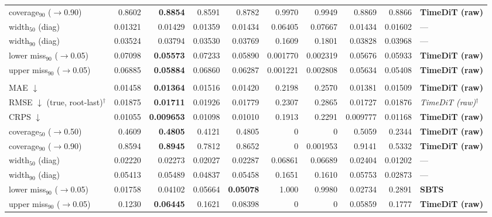 \documentclass[11pt,a4paper]{article}
\begin{document}
\begin{landscape}
\begin{center}
\begin{tabular}{lrrrrrrrrl}
coverage$_{90}$ ($\to$0.90) & 0.8602 & \textbf{0.8854} & 0.8591 & 0.8782 & 0.9970 & 0.9949 & 0.8869 & 0.8866 & \textbf{TimeDiT (raw)} \\
width$_{50}$ (diag) & 0.01321 & 0.01429 & 0.01359 & 0.01434 & 0.06405 & 0.07667 & 0.01434 & 0.01602 & --- \\
width$_{90}$ (diag) & 0.03524 & 0.03794 & 0.03530 & 0.03769 & 0.1609 & 0.1801 & 0.03828 & 0.03968 & --- \\
lower miss$_{90}$ ($\to$0.05) & 0.07098 & \textbf{0.05573} & 0.07233 & 0.05890 & 0.001770 & 0.002319 & 0.05676 & 0.05933 & \textbf{TimeDiT (raw)} \\
upper miss$_{90}$ ($\to$0.05) & 0.06885 & \textbf{0.05884} & 0.06860 & 0.06287 & 0.001221 & 0.002808 & 0.05634 & 0.05408 & \textbf{TimeDiT (raw)} \\
\addlinespace
\multicolumn{10}{l}{\textbf{rv ($M$ scalar)}} \\
MAE $\downarrow$ & 0.01458 & \textbf{0.01364} & 0.01516 & 0.01420 & 0.2198 & 0.2570 & 0.01381 & 0.01509 & \textbf{TimeDiT (raw)} \\
RMSE $\downarrow$ (true, root-last)$^{\dagger}$ & 0.01875 & \textbf{0.01711} & 0.01926 & 0.01779 & 0.2307 & 0.2865 & 0.01727 & 0.01876 & \textit{TimeDiT (raw)}$^{\dagger}$ \\
CRPS $\downarrow$ & 0.01055 & \textbf{0.009653} & 0.01098 & 0.01010 & 0.1913 & 0.2291 & 0.009777 & 0.01168 & \textbf{TimeDiT (raw)} \\
coverage$_{50}$ ($\to$0.50) & 0.4609 & \textbf{0.4805} & 0.4121 & 0.4805 & 0 & 0 & 0.5059 & 0.2344 & \textbf{TimeDiT (raw)} \\
coverage$_{90}$ ($\to$0.90) & 0.8594 & \textbf{0.8945} & 0.7812 & 0.8652 & 0 & 0.001953 & 0.9141 & 0.5332 & \textbf{TimeDiT (raw)} \\
width$_{50}$ (diag) & 0.02220 & 0.02273 & 0.02027 & 0.02287 & 0.06861 & 0.06689 & 0.02404 & 0.01202 & --- \\
width$_{90}$ (diag) & 0.05413 & 0.05489 & 0.04837 & 0.05458 & 0.1651 & 0.1610 & 0.05753 & 0.02873 & --- \\
lower miss$_{90}$ ($\to$0.05) & 0.01758 & 0.04102 & 0.05664 & \textbf{0.05078} & 1.000 & 0.9980 & 0.02734 & 0.2891 & \textbf{SBTS} \\
upper miss$_{90}$ ($\to$0.05) & 0.1230 & \textbf{0.06445} & 0.1621 & 0.08398 & 0 & 0 & 0.05859 & 0.1777 & \textbf{TimeDiT (raw)} \\
\bottomrule
\end{tabular}
\end{center}
\end{landscape}
\end{document}
